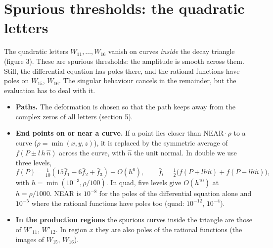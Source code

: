 \documentclass[11pt]{article}
\begin{document}
\section{Spurious thresholds: the quadratic letters}
The quadratic letters $W_{11},\dots,W_{16}$ vanish on curves \emph{inside} the decay triangle (figure 3). These are
spurious thresholds: the amplitude is smooth across them. Still, the differential equation has poles there, and the
rational functions have poles on $W_{15}$, $W_{16}$. The singular behaviour cancels in the remainder, but the
evaluation has to deal with it.
\begin{itemize}
\item \textbf{Paths.} The deformation is chosen so that the path keeps away from the complex zeros of all letters
  (section 5).
\item \textbf{End points on or near a curve.} If a point lies closer than $\mathrm{NEAR}\cdot\rho$ to a curve
  ($\rho=\min(x,y,z)$), it is replaced by the symmetric average of $f(P\pm l\,h\,\hat n)$ across the curve, with $\hat n$ the
  unit normal. In double we use three levels,
  \[
    f(P)=\tfrac1{10}(15\bar f_1-6\bar f_2+\bar f_3)+O(h^6),\qquad \bar f_l=\tfrac12\big(f(P+lh\hat n)+f(P-lh\hat n)\big),
  \]
  with $h=\min(10^{-3},\rho/100)$. In quad, five levels give $O(h^{10})$ at $h=\rho/1000$. NEAR is $10^{-8}$ for the
  poles of the differential equation alone and $10^{-5}$ where the rational functions have poles too (quad:
  $10^{-12}$, $10^{-4}$).
\item \textbf{In the production regions} the spurious curves inside the triangle are those of $W'_{11}$, $W'_{12}$. In
  region $x$ they are also poles of the rational functions (the images of $W_{15}$, $W_{16}$).
\end{itemize}
\end{document}
